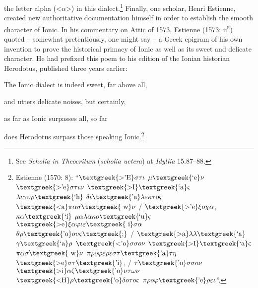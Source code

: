 \begin{styleStandard}
the letter alpha ({\textless}$\alpha ${\textgreater}) in this dialect.\footnote{ See \textit{Scholia in Theocritum} (\textit{scholia uetera}) at \textit{Idyllia} 15.87–88.} Finally, one scholar, Henri Estienne, created new authoritative documentation himself in order to establish the smooth character of Ionic. In his commentary on Attic of 1573, Estienne (1573: ii\textsc{\textsuperscript{r}}) quoted – somewhat pretentiously, one might say – a Greek epigram of his own invention to prove the historical primacy of Ionic as well as its sweet and delicate character. He had prefixed this poem to his edition of the Ionian historian Herodotus, published three years earlier:
\end{styleStandard}

\begin{styleQuote}
The Ionic dialect is indeed sweet, far above all,
\end{styleQuote}

\begin{styleQuote}
and utters delicate noises, but certainly,
\end{styleQuote}

\begin{styleQuote}
as far as Ionic surpasses all, so far
\end{styleQuote}

\begin{styleQuote}
does Herodotus surpass those speaking Ionic.\footnote{ Estienne (1570: 8): “$\text{\textgreek{>'E}}\sigma \tau \iota $ $\mu \text{\textgreek{`e}}\nu $ $\text{\textgreek{>'e}}\sigma \tau \iota \nu $ $\text{\textgreek{>I}}\text{\textgreek{`a}}\varsigma $ $\lambda \iota \gamma \upsilon \rho \text{\textgreek{`h}}$ $\delta \iota \text{\textgreek{'a}}\lambda \varepsilon \kappa \tau o\varsigma $ $\text{\textgreek{<a}}\pi \alpha \sigma \text{\textgreek{~w}}\nu $ / $\text{\textgreek{>'e}}\xi o\chi \alpha $, $\kappa \alpha \text{\textgreek{`i}}$ $\mu \alpha \lambda \alpha \kappa o\text{\textgreek{`u}}\varsigma $ $\text{\textgreek{>e}}\xi \alpha \varphi \iota \varepsilon \text{\textgreek{~i}}\sigma \alpha $ $\theta \rho \text{\textgreek{'o}}o\upsilon \varsigma \text{\textgreek{;}}$ / $\text{\textgreek{>a}}\lambda \lambda \text{\textgreek{`a}}$ $\gamma \text{\textgreek{`a}}\rho $ $\text{\textgreek{<'o}}\sigma \sigma o\nu $ $\text{\textgreek{>I}}\text{\textgreek{`a}}\varsigma $ $\pi \alpha \sigma \text{\textgreek{~w}}\nu $ $\pi \rho o\varphi \varepsilon \rho \varepsilon \sigma \tau \text{\textgreek{'a}}\tau \eta $ $\text{\textgreek{>e}}\sigma \tau \text{\textgreek{'i}}$, / $\tau \text{\textgreek{'o}}\sigma \sigma o\nu $ $\text{\textgreek{>i}}\alpha \zeta \text{\textgreek{'o}}\nu \tau \omega \nu $ $\text{\textgreek{<H}}\rho \text{\textgreek{'o}}\delta o\tau o\varsigma $ $\pi \rho o\varphi \text{\textgreek{'e}}\rho \varepsilon \iota $”.}
\end{styleQuote}

